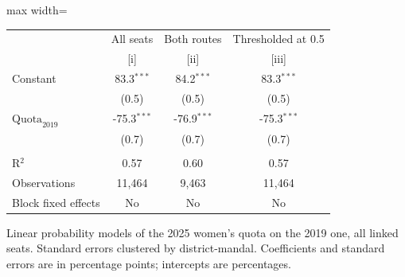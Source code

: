 
\begingroup
\centering
\scriptsize
\begin{adjustbox}{max width=\linewidth}
   \begin{threeparttable}[b]
      \begin{tabular}{lccc}
         \toprule
                                & All seats     & Both routes   & Thresholded at 0.5 \\
                                & [i]           & [ii]          & [iii]\\
         \midrule
         Constant               & 83.3$^{***}$  & 84.2$^{***}$  & 83.3$^{***}$\\
                                & (0.5)         & (0.5)         & (0.5)\\
         $\text{Quota}_{2019}$  & -75.3$^{***}$ & -76.9$^{***}$ & -75.3$^{***}$\\
                                & (0.7)         & (0.7)         & (0.7)\\
          \\
         R$^2$                  & 0.57          & 0.60          & 0.57\\
         Observations           & 11,464        & 9,463         & 11,464\\
         Block fixed effects    & No            & No            & No\\
         \bottomrule
      \end{tabular}

      \begin{tablenotes}
         \item Linear probability models of the 2025 women's quota on the 2019 one, all linked seats. Standard errors clustered by district-mandal. Coefficients and standard errors are in percentage points; intercepts are percentages.
      \end{tablenotes}
   \end{threeparttable}
\end{adjustbox}
\par\endgroup


